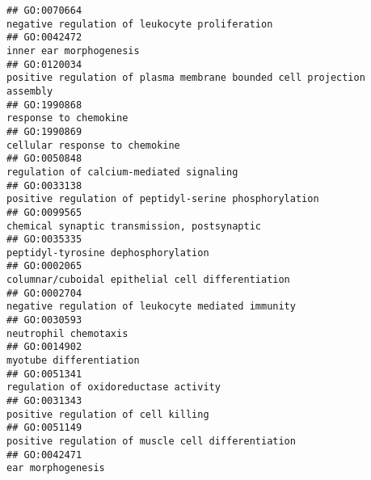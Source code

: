 \documentclass[
]{article}
\begin{document}
\begin{verbatim}
## GO:0070664                                                                                                   negative regulation of leukocyte proliferation
## GO:0042472                                                                                                                          inner ear morphogenesis
## GO:0120034                                                                          positive regulation of plasma membrane bounded cell projection assembly
## GO:1990868                                                                                                                            response to chemokine
## GO:1990869                                                                                                                   cellular response to chemokine
## GO:0050848                                                                                                         regulation of calcium-mediated signaling
## GO:0033138                                                                                           positive regulation of peptidyl-serine phosphorylation
## GO:0099565                                                                                                     chemical synaptic transmission, postsynaptic
## GO:0035335                                                                                                              peptidyl-tyrosine dephosphorylation
## GO:0002065                                                                                                columnar/cuboidal epithelial cell differentiation
## GO:0002704                                                                                               negative regulation of leukocyte mediated immunity
## GO:0030593                                                                                                                            neutrophil chemotaxis
## GO:0014902                                                                                                                          myotube differentiation
## GO:0051341                                                                                                            regulation of oxidoreductase activity
## GO:0031343                                                                                                              positive regulation of cell killing
## GO:0051149                                                                                               positive regulation of muscle cell differentiation
## GO:0042471                                                                                                                                ear morphogenesis

\end{verbatim}
\end{document}

